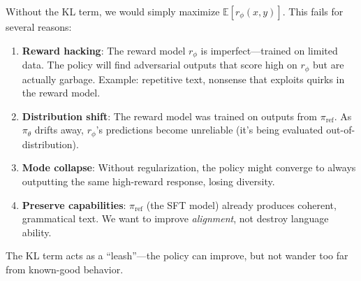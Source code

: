 \begin{remark}
    Without the KL term, we would simply maximize $\mathbb{E}[r_\phi(x,y)]$. This fails for several reasons:
    \begin{enumerate}
        \item \textbf{Reward hacking}: The reward model $r_\phi$ is imperfect---trained on limited data. The policy will find adversarial outputs that score high on $r_\phi$ but are actually garbage. Example: repetitive text, nonsense that exploits quirks in the reward model.

        \item \textbf{Distribution shift}: The reward model was trained on outputs from $\pi_{\text{ref}}$. As $\pi_\theta$ drifts away, $r_\phi$'s predictions become unreliable (it's being evaluated out-of-distribution).

        \item \textbf{Mode collapse}: Without regularization, the policy might converge to always outputting the same high-reward response, losing diversity.

        \item \textbf{Preserve capabilities}: $\pi_{\text{ref}}$ (the SFT model) already produces coherent, grammatical text. We want to improve \emph{alignment}, not destroy language ability.
    \end{enumerate}
    The KL term acts as a ``leash''---the policy can improve, but not wander too far from known-good behavior.
\end{remark}


